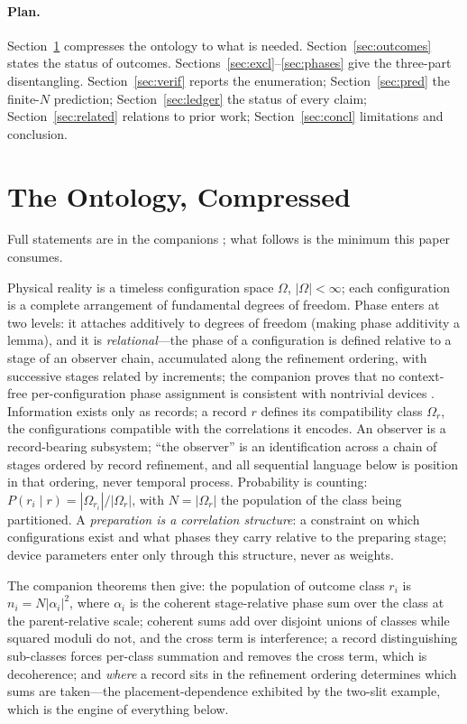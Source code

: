\documentclass[11pt]{article}
\theoremstyle{definition}
\theoremstyle{remark}
\begin{document}
\paragraph{Plan.}
Section~\ref{sec:defs} compresses the ontology to what is needed. Section~\ref{sec:outcomes} states the status of outcomes. Sections~\ref{sec:excl}--\ref{sec:phases} give the three-part disentangling. Section~\ref{sec:verif} reports the enumeration; Section~\ref{sec:pred} the finite-$N$ prediction; Section~\ref{sec:ledger} the status of every claim; Section~\ref{sec:related} relations to prior work; Section~\ref{sec:concl} limitations and conclusion.

\section{The Ontology, Compressed}\label{sec:defs}
Full statements are in the companions \cite{TillittBorn,TillittCR}; what follows is the minimum this paper consumes.

Physical reality is a timeless configuration space $\Omega$, $|\Omega| < \infty$; each configuration is a complete arrangement of fundamental degrees of freedom. Phase enters at two levels: it attaches additively to degrees of freedom (making phase additivity a lemma), and it is \emph{relational}---the phase of a configuration is defined relative to a stage of an observer chain, accumulated along the refinement ordering, with successive stages related by increments; the companion proves that no context-free per-configuration phase assignment is consistent with nontrivial devices \cite{TillittBorn}. Information exists only as records; a record $r$ defines its compatibility class $\Omega_r$, the configurations compatible with the correlations it encodes. An observer is a record-bearing subsystem; ``the observer'' is an identification across a chain of stages ordered by record refinement, and all sequential language below is position in that ordering, never temporal process. Probability is counting: $P(r_i \mid r) = |\Omega_{r_i}|/|\Omega_r|$, with $N = |\Omega_r|$ the population of the class being partitioned. A \emph{preparation is a correlation structure}: a constraint on which configurations exist and what phases they carry relative to the preparing stage; device parameters enter only through this structure, never as weights.

The companion theorems then give: the population of outcome class $r_i$ is $n_i = N|\alpha_i|^2$, where $\alpha_i$ is the coherent stage-relative phase sum over the class at the parent-relative scale; coherent sums add over disjoint unions of classes while squared moduli do not, and the cross term is interference; a record distinguishing sub-classes forces per-class summation and removes the cross term, which is decoherence; and \emph{where} a record sits in the refinement ordering determines which sums are taken---the placement-dependence exhibited by the two-slit example, which is the engine of everything below.
\end{document}
